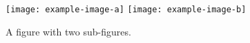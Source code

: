 \begin{figure}[t] \centering
    \texttt{[image: example-image-a]} \hfill
    \texttt{[image: example-image-b]} 
    \\
    \caption{A figure with two sub-figures.} \label{fig:figure6}
\end{figure}

